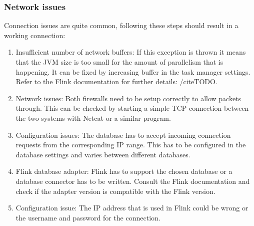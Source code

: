 \subsubsection{Network issues}
\label{mdfCorrectNetwork}
Connection issues are quite common, following these steps should result in a working connection:
\begin{enumerate}
  \item Insufficient number of network buffers: If this exception is thrown it means that the JVM size is too small for the amount of parallelism that is happening. It can be fixed by increasing buffer in the task manager settings. Refer to the Flink documentation for further details: /cite{TODO}.
  \item Network issues: Both firewalls need to be setup correctly to allow packets through. This can be checked by starting a simple TCP connection between the two systems with Netcat or a similar program.
  \item Configuration issues: The database has to accept incoming connection requests from the corresponding IP range. This has to be configured in the database settings and varies between different databases.
  \item Flink database adapter: Flink has to support the chosen database or a database connector has to be written. Consult the Flink documentation and check if the adapter version is compatible with the Flink version.
  \item Configuration issue: The IP address that is used in Flink could be wrong or the username and password for the connection.
\end{enumerate}

